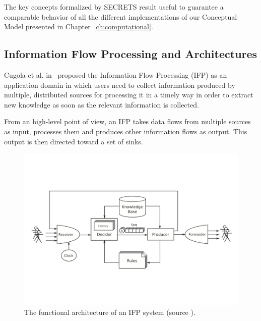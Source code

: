 The key concepts formalized by SECRETS result useful to guarantee a comparable behavior of all the different implementations of our Conceptual Model presented in Chapter~\ref{ch:computational}.

\subsection{Information Flow Processing and Architectures}\label{sec:vel-arch}

Cugola et al. in~\cite{DBLP:journals/csur/CugolaM12} proposed the Information Flow Processing (IFP) as an application domain in which users need to collect information produced by multiple, distributed sources for processing it in a timely way in order to extract new knowledge as soon as the relevant information is collected.

From an high-level point of view, an IFP takes data flows from multiple sources as input, processes them and produces other information flows as output. This output is then directed toward a set of sinks.

\begin{figure}[h]
  \begin{center}
    \includegraphics[width=\textwidth]{img/ifp}
    \caption{The functional architecture of an IFP system (source \cite{DBLP:journals/csur/CugolaM12}).}
    \label{fig:ifp}
  \end{center}
\end{figure}

